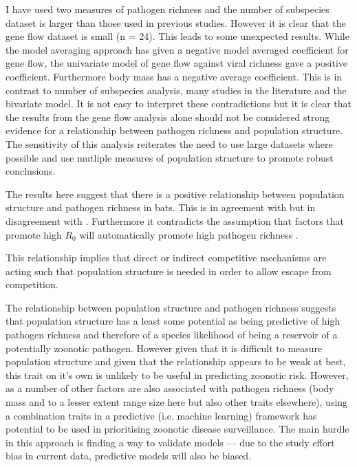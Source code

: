 I have used two measures of pathogen richness and the number of subspecies dataset is larger than those used in previous studies.
However it is clear that the gene flow dataset is small (n = 24).
This leads to some unexpected results.
While the model averaging approach has given a negative model averaged coefficient for gene flow, the univariate model of gene flow against viral richness gave a positive coefficient.
Furthermore body mass has a negative average coefficient.
This is in contrast to number of subspecies analysis, many studies in the literature \cite{kamiya2014determines, turmelle2009correlates, gay2014parasite, maganga2014bat} and the bivariate model.
It is not easy to interpret these contradictions but it is clear that the results from the gene flow analysis alone should not be considered strong evidence for a relationship between pathogen richness and population structure.
The sensitivity of this analysis reiterates the need to use large datasets where possible and use mutliple measures of population structure to promote robust conclusions.


The results here suggest that there is a positive relationship between population structure and pathogen richness in bats.
This is in agreement with \cite{maganga2014bat, turmelle2009correlates} but in disagreement with \cite{gay2014parasite}.
Furthermore it contradicts the assumption that factors that promote high $R_0$ will automatically promote high pathogen richness \cite{nunn2003comparative, morand2000wormy}.

This relationship implies that direct or indirect competitive mechanisms are acting such that population structure is needed in order to allow escape from competition.

The relationship between population structure and pathogen richness suggests that population structure has a least some potential as being predictive of high pathogen richness and therefore of a species likelihood of being a reservoir of a potentially zoonotic pathogen. 
However given that it is difficult to measure population structure and given that the relationship appears to be weak at best, this trait on it's own is unlikely to be useful in predicting zoonotic risk.
However, as a number of other factors are also associated with pathogen richness (body mass and to a lesser extent range size here but also other traits elsewhere), using a combination traits in a predictive (i.e. machine learning) framework has potential to be used in prioritising zoonotic disease surveillance.
The main hurdle in this approach is finding a way to validate models --- due to the study effort bias in current data, predictive models will also be biased.


